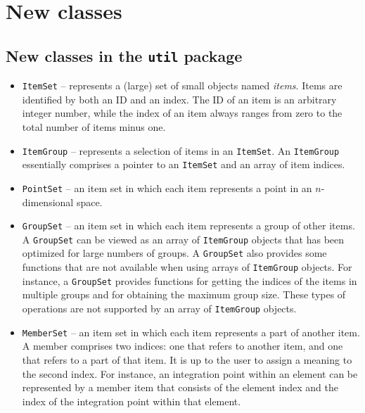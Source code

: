 \documentclass[a4paper,11pt]{article}
\newcommand{\Code}[1]{\texttt{#1}}
\begin{document}
\section{New classes}


\subsection{New classes in the \Code{util} package}

\begin{itemize}

\item \Code{ItemSet} -- represents a (large) set of small objects
  named \emph{items}. Items are identified by both an ID and an
  index. The ID of an item is an arbitrary integer number, while the
  index of an item always ranges from zero to the total number of
  items minus one.

\item \Code{ItemGroup} -- represents a selection of items in an
  \Code{ItemSet}. An \Code{ItemGroup} essentially comprises a pointer
  to an \Code{ItemSet} and an array of item indices.

\item \Code{PointSet} -- an item set in which each item represents a
  point in an $n$-dimensional space.

\item \Code{GroupSet} -- an item set in which each item represents a
  group of other items. A \Code{GroupSet} can be viewed as an array of
  \Code{ItemGroup} objects that has been optimized for large numbers
  of groups. A \Code{GroupSet} also provides some functions that are
  not available when using arrays of \Code{ItemGroup} objects. For
  instance, a \Code{GroupSet} provides functions for getting the
  indices of the items in multiple groups and for obtaining the
  maximum group size. These types of operations are not supported by
  an array of \Code{ItemGroup} objects.

\item \Code{MemberSet} -- an item set in which each item represents a
  part of another item. A member comprises two indices: one that
  refers to another item, and one that refers to a part of that item.
  It is up to the user to assign a meaning to the second index. For
  instance, an integration point within an element can be represented
  by a member item that consists of the element index and the index of
  the integration point within that element.


\end{itemize}
\end{document}
